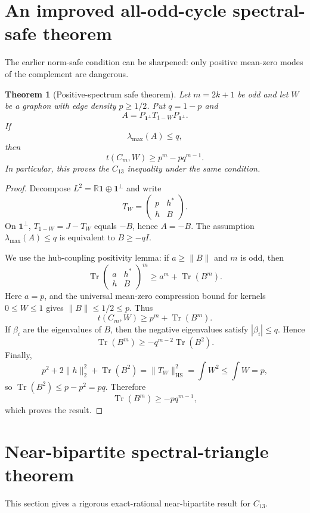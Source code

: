 \documentclass[11pt]{article}
\newtheorem{theorem}{Theorem}[section]
\newcommand{\one}{\mathbf 1}
\newcommand{\R}{\mathbb R}
\DeclareMathOperator{\Tr}{Tr}
\begin{document}
\section{An improved all-odd-cycle spectral-safe theorem}\label{sec:spectral-safe}

The earlier norm-safe condition can be sharpened: only positive mean-zero modes
of the complement are dangerous.

\begin{theorem}[Positive-spectrum safe theorem]\label{thm:pos-spec-safe}
Let $m=2k+1$ be odd and let $W$ be a graphon with edge density $p\ge1/2$.
Put $q=1-p$ and
\[
        A=P_{\one^\perp}T_{1-W}P_{\one^\perp}.
\]
If
\[
        \lambda_{\max}(A)\le q,
\]
then
\[
        t(C_m,W)\ge p^m-pq^{m-1}.
\]
In particular, this proves the $C_{13}$ inequality under the same condition.
\end{theorem}

\begin{proof}
Decompose $L^2=\R\one\oplus\one^\perp$ and write
\[
        T_W=\begin{pmatrix}p&h^*\\ h&B\end{pmatrix}.
\]
On $\one^\perp$, $T_{1-W}=J-T_W$ equals $-B$, hence $A=-B$.  The assumption
$\lambda_{\max}(A)\le q$ is equivalent to $B\ge -qI$.

We use the hub-coupling positivity lemma: if $a\ge\|B\|$ and $m$ is odd, then
\[
        \Tr\begin{pmatrix}a&h^*\\h&B\end{pmatrix}^{m}
        \ge a^m+\Tr(B^m).
\]
Here $a=p$, and the universal mean-zero compression bound for kernels
$0\le W\le1$ gives $\|B\|\le1/2\le p$.  Thus
\[
        t(C_m,W)\ge p^m+\Tr(B^m).
\]
If $\beta_i$ are the eigenvalues of $B$, then the negative eigenvalues satisfy
$|\beta_i|\le q$.  Hence
\[
        \Tr(B^m)\ge -q^{m-2}\Tr(B^2).
\]
Finally,
\[
        p^2+2\|h\|_2^2+\Tr(B^2)=\|T_W\|_{\mathrm{HS}}^2
        =\int W^2\le\int W=p,
\]
so $\Tr(B^2)\le p-p^2=pq$.  Therefore
\[
        \Tr(B^m)\ge -pq^{m-1},
\]
which proves the result.
\end{proof}

\section{Near-bipartite spectral-triangle theorem}\label{sec:near-bipartite}

This section gives a rigorous exact-rational near-bipartite result for
$C_{13}$.
\end{document}
